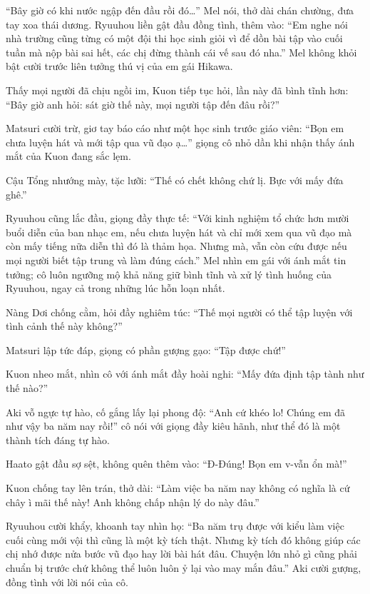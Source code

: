 \documentclass[../main.tex]{subfiles}
\begin{document}
``Bây giờ có khi nước ngập đến đầu rồi đó\dots'' Mel nói, thở dài chán chường, đưa tay xoa thái dương. Ryuuhou liền gật đầu đồng tình, thêm vào: ``Em nghe nói nhà trường cũng từng có một đội thi học sinh giỏi vì để dồn bài tập vào cuối tuần mà nộp bài sai hết, các chị đừng thành cái vế sau đó nha.'' Mel không khỏi bật cười trước liên tưởng thú vị của em gái Hikawa.

Thấy mọi người đã chịu ngồi im, Kuon tiếp tục hỏi, lần này đã bình tĩnh hơn: ``Bây giờ anh hỏi: sát giờ thế này, mọi người tập đến đâu rồi?''

Matsuri cười trừ, giơ tay báo cáo như một học sinh trước giáo viên: ``Bọn em chưa luyện hát và mới tập qua vũ đạo ạ\dots'' giọng cô nhỏ dần khi nhận thấy ánh mắt của Kuon đang sắc lẹm.

Cậu Tổng nhướng mày, tặc lưỡi: ``Thế có chết không chứ lị. Bực với mấy đứa ghê.''

Ryuuhou cũng lắc đầu, giọng đầy thực tế: ``Với kinh nghiệm tổ chức hơn mười buổi diễn của ban nhạc em, nếu chưa luyện hát và chỉ mới xem qua vũ đạo mà còn mấy tiếng nữa diễn thì đó là thảm họa. Nhưng mà, vẫn còn cứu được nếu mọi người biết tập trung và làm đúng cách.'' Mel nhìn em gái với ánh mắt tin tưởng; cô luôn ngưỡng mộ khả năng giữ bình tĩnh và xử lý tình huống của Ryuuhou, ngay cả trong những lúc hỗn loạn nhất.

Nàng Dơi chống cằm, hỏi đầy nghiêm túc: ``Thế mọi người có thể tập luyện với tình cảnh thế này không?''

Matsuri lập tức đáp, giọng có phần gượng gạo: ``Tập được chứ!''

Kuon nheo mắt, nhìn cô với ánh mắt đầy hoài nghi: ``Mấy đứa định tập tành như thế nào?''

Aki vỗ ngực tự hào, cố gắng lấy lại phong độ: ``Anh cứ khéo lo! Chúng em đã như vậy ba năm nay rồi!'' cô nói với giọng đầy kiêu hãnh, như thể đó là một thành tích đáng tự hào.

Haato gật đầu sợ sệt, không quên thêm vào: ``Đ-Đúng! Bọn em v-vẫn ổn mà!''

Kuon chống tay lên trán, thở dài: ``Làm việc ba năm nay không có nghĩa là cứ chây ì mãi thế này! Anh không chấp nhận lý do này đâu.''

Ryuuhou cười khẩy, khoanh tay nhìn họ: ``Ba năm trụ được với kiểu làm việc cuối cùng mới vội thì cũng là một kỳ tích thật. Nhưng kỳ tích đó không giúp các chị nhớ được nửa bước vũ đạo hay lời bài hát đâu. Chuyện lớn nhỏ gì cũng phải chuẩn bị trước chứ không thể luôn luôn ỷ lại vào may mắn đâu.'' Aki cười gượng, đồng tình với lời nói của cô.
\end{document}

